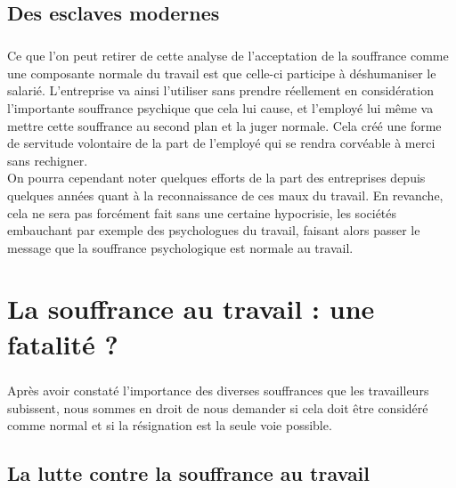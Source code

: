 \documentclass{report}
\begin{document}
	\section*{Des esclaves modernes}
		\paragraph{}
			Ce que l'on peut retirer de cette analyse de l'acceptation de la souffrance comme une composante normale du travail est que celle-ci participe à déshumaniser le salarié. L'entreprise va ainsi l'utiliser sans prendre réellement en considération l'importante souffrance psychique que cela lui cause, et l'employé lui même va mettre cette souffrance au second plan et la juger normale. Cela créé une forme de servitude volontaire de la part de l'employé qui se rendra corvéable à merci sans rechigner. \\
			On pourra cependant noter quelques efforts de la part des entreprises depuis quelques années quant à la reconnaissance de ces maux du travail. En revanche, cela ne sera pas forcément fait sans une certaine hypocrisie, les sociétés embauchant par exemple des psychologues du travail, faisant alors passer le message que la souffrance psychologique est normale au travail.

\chapter{La souffrance au travail : une fatalité ?}
	\paragraph{}
		Après avoir constaté l'importance des diverses souffrances que les travailleurs subissent, nous sommes en droit de nous demander si cela doit être considéré comme normal et si la résignation est la seule voie possible.

	\section{La lutte contre la souffrance au travail}
\end{document}
